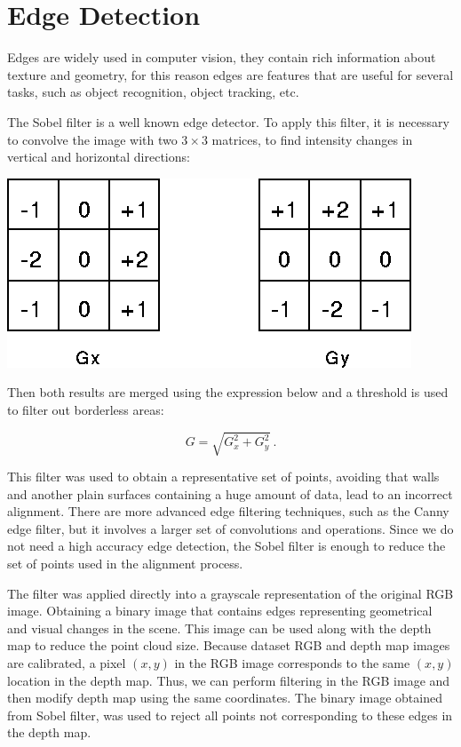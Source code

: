 \section{Edge Detection}

Edges are widely used in computer vision, they contain rich information about texture 
and geometry, for this reason edges are features that are useful for several tasks, 
such as object recognition, object tracking, etc.


The Sobel filter is a well known edge detector. To apply this filter, it is necessary to 
convolve the image with two $3\times3$ matrices, to find intensity changes in vertical and 
horizontal directions:

\begin{center}
\includegraphics[scale=0.35]{images/sobel}
\end{center}

Then both results are merged using the expression below and a threshold is used to filter out borderless areas:

\begin{equation}
G = \sqrt{G_x^2+ G_y^2}\ .
\label{eq:sobelGrad}
\end{equation}

This filter was used to obtain a representative set of points, avoiding that walls and another 
plain surfaces containing a huge amount of data, lead to an incorrect alignment.
There are more advanced edge filtering techniques, such as the Canny edge filter, but it involves 
a larger set of convolutions and operations. Since we do not need a high accuracy edge detection, the Sobel 
filter is enough to reduce the set of points used in the alignment process. 

The filter was applied directly into a grayscale representation of the original RGB image. Obtaining a binary image 
that contains edges representing geometrical and visual changes in the scene. 
This image can be used along with the depth map to reduce the point cloud size. Because dataset RGB and depth map images are 
calibrated, a pixel $(x,y)$ in the RGB image corresponds to the same $(x,y)$ location in the depth map. Thus, we can perform filtering 
in the RGB image and then modify depth map using the same coordinates. The binary image obtained from Sobel filter, was used 
to reject all points not corresponding
to these edges in the depth map. 

